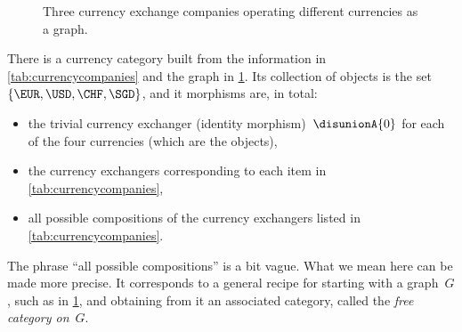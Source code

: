 \begin{figure}[h]
	\begin{center}
	\end{center}
	\caption{Three currency exchange companies operating different currencies as a graph. }
	\label{fig:currencygraph}
\end{figure}

There is a currency category built from the information in \cref{tab:currencycompanies} and the graph in \cref{fig:currencygraph}.
Its collection of objects is the set $\{  \EUR, \USD, \CHF, \SGD \}$, and it morphisms are, in total:
\begin{itemize}
	\item the trivial currency exchanger (identity morphism)~$\disunionA{0}$ for each of the four currencies (which are the objects),
	\item the currency exchangers corresponding to each item in \cref{tab:currencycompanies},
	\item all possible compositions of the currency exchangers listed in \cref{tab:currencycompanies}.
\end{itemize}

The phrase ``all possible compositions'' is a bit vague.
What we mean here can be made more precise.
It corresponds to a general recipe for starting with a graph~$G$, such as in \cref{fig:currencygraph}, and obtaining from it an associated category, called the \emph{free category on}~$G$.


